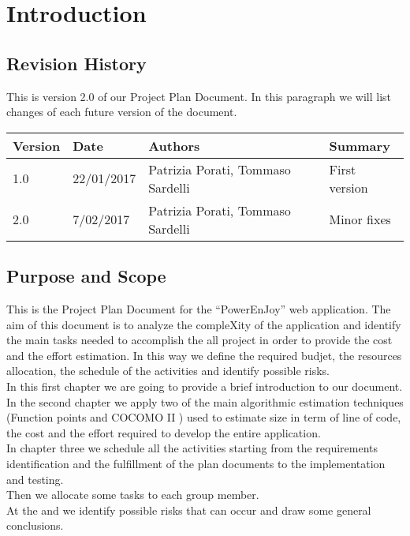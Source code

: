 \section{Introduction}

\subsection{Revision History}

	This is version 2.0 of our Project Plan Document.
	In this paragraph we will list changes of each future version of the document. \\
	
	\begin{tabular}{|l|l|l|l|}
		\hline
		\textbf{Version}	& \textbf{Date}	& \textbf{Authors}	& \textbf{Summary}\\
		\hline
		1.0					& 22/01/2017		& Patrizia Porati, Tommaso Sardelli	& First version\\
		\hline
		2.0					& 7/02/2017		& Patrizia Porati, Tommaso Sardelli	& Minor fixes\\
		\hline
	\end{tabular}

\subsection{Purpose and Scope}

	This is the Project Plan Document for the ``PowerEnJoy'' web application. The aim of this document is to analyze the compleXity of the application and identify the main tasks needed to accomplish the all project in order to provide the cost and the effort estimation. In this way we define the required budjet, the resources allocation, the schedule of the activities and identify possible risks. \\
	In this first chapter we are going to provide a brief introduction to our document. \\
	In the second chapter we apply two of the main algorithmic estimation techniques (Function points and COCOMO  II ) used to estimate size in term of line of code, the cost and the effort required to develop the entire application. \\
	In chapter three we schedule all the activities starting from the requirements identification and the fulfillment of the plan documents to the implementation and testing. \\
	Then we allocate some tasks to each group member. \\
	At the and we identify possible risks that can occur and draw some general conclusions.
	
